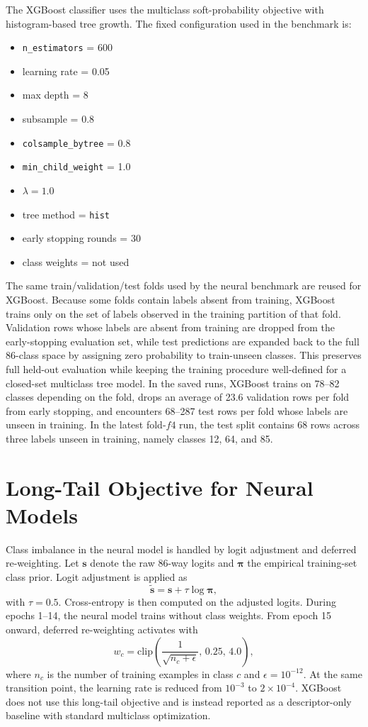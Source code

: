 The XGBoost classifier uses the multiclass soft-probability objective with histogram-based tree growth. The fixed configuration used in the benchmark is:
\begin{itemize}
\item \texttt{n\_estimators} = 600
\item learning rate = 0.05
\item max depth = 8
\item subsample = 0.8
\item \texttt{colsample\_bytree} = 0.8
\item \texttt{min\_child\_weight} = 1.0
\item \(\lambda = 1.0\)
\item tree method = \texttt{hist}
\item early stopping rounds = 30
\item class weights = not used
\end{itemize}

The same train/validation/test folds used by the neural benchmark are reused for XGBoost. Because some folds contain labels absent from training, XGBoost trains only on the set of labels observed in the training partition of that fold. Validation rows whose labels are absent from training are dropped from the early-stopping evaluation set, while test predictions are expanded back to the full 86-class space by assigning zero probability to train-unseen classes. This preserves full held-out evaluation while keeping the training procedure well-defined for a closed-set multiclass tree model. In the saved runs, XGBoost trains on 78--82 classes depending on the fold, drops an average of 23.6 validation rows per fold from early stopping, and encounters 68--287 test rows per fold whose labels are unseen in training. In the latest fold-\(f4\) run, the test split contains 68 rows across three labels unseen in training, namely classes 12, 64, and 85.

\section{Long-Tail Objective for Neural Models}
Class imbalance in the neural model is handled by logit adjustment and deferred re-weighting. Let \(\mathbf{s}\) denote the raw 86-way logits and \(\boldsymbol{\pi}\) the empirical training-set class prior. Logit adjustment is applied as
\begin{equation}
\tilde{\mathbf{s}}=\mathbf{s}+\tau \log \boldsymbol{\pi},
\end{equation}
with \(\tau=0.5\). Cross-entropy is then computed on the adjusted logits. During epochs 1--14, the neural model trains without class weights. From epoch 15 onward, deferred re-weighting activates with
\begin{equation}
w_c=\mathrm{clip}\left(\frac{1}{\sqrt{n_c+\epsilon}},\,0.25,\,4.0\right),
\end{equation}
where \(n_c\) is the number of training examples in class \(c\) and \(\epsilon=10^{-12}\). At the same transition point, the learning rate is reduced from \(10^{-3}\) to \(2\times 10^{-4}\). XGBoost does not use this long-tail objective and is instead reported as a descriptor-only baseline with standard multiclass optimization.


